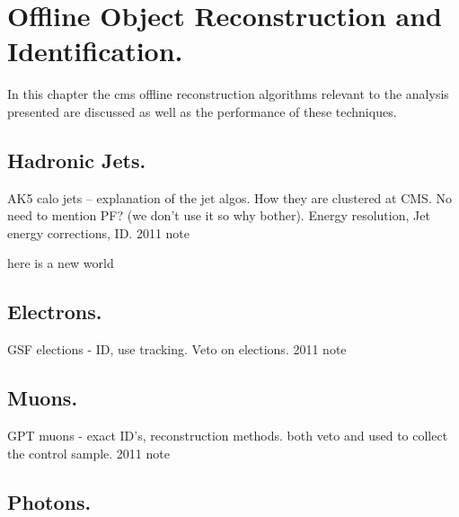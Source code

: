 \chapter{Offline Object Reconstruction and Identification.} %
\label{cha:offline_object_deffinitions}
In this chapter the \ac{cms} offline reconstruction algorithms relevant to the analysis presented are discussed as well as the performance of these techniques.
\section{Hadronic Jets.} %
\label{sec:hadronic_jets}
AK5 calo jets -- explanation of the jet algos. How they are clustered at CMS.
No need to mention PF? (we don't use it so why bother). Energy resolution, Jet 
energy corrections, ID. 2011 note

here is a new world


\section{Electrons.} %
\label{sec:electrons}
GSF elections - ID, use tracking. Veto on elections. 2011 note

\section{Muons.} %
\label{sec:muons}
GPT muons - exact ID's, reconstruction methods. both veto and used to collect 
the control sample. 2011 note

\section{Photons.} %
\label{sec:photons}



